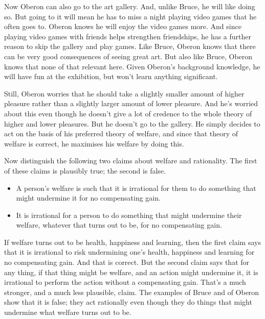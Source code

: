 \documentclass[
  10pt,
  letterpaper,
  twoside]{scrbook}
\providecommand{\tightlist}{%
  \setlength{\itemsep}{0pt}\setlength{\parskip}{0pt}}\usepackage{longtable,booktabs,array}
\begin{document}
Now {Oberon} can also go to the art gallery. And, unlike {Bruce}, he
will like doing so. But going to it will mean he has to miss a night
playing video games that he often goes to. {Oberon} knows he will enjoy
the video games more. And since playing video games with friends helps
strengthen friendships, he has a further reason to skip the gallery and
play games. Like {Bruce}, {Oberon} knows that there can be very good
consequences of seeing great art. But also like {Bruce}, {Oberon} knows
that none of that relevant here. Given {Oberon}'s background knowledge,
he will have fun at the exhibition, but won't learn anything
significant.

Still, {Oberon} worries that he should take a slightly smaller amount of
higher pleasure rather than a slightly larger amount of lower pleasure.
And he's worried about this even though he doesn't give a lot of
credence to the whole theory of higher and lower pleasures. But he
doesn't go to the gallery. He simply decides to act on the basis of his
preferred theory of welfare, and since that theory of welfare is
correct, he maximises his welfare by doing this.

Now distinguish the following two claims about welfare and rationality.
The first of these claims is plausibly true; the second is false.

\begin{itemize}
\tightlist
\item
  A person's welfare is such that it is irrational for them to do
  something that might undermine it for no compensating gain.
\item
  It is irrational for a person to do something that might undermine
  their welfare, whatever that turns out to be, for no compensating
  gain.
\end{itemize}

If welfare turns out to be health, happiness and learning, then the
first claim says that it is irrational to risk undermining one's health,
happiness and learning for no compensating gain. And that is correct.
But the second claim says that for any thing, if that thing might be
welfare, and an action might undermine it, it is irrational to perform
the action without a compensating gain. That's a much stronger, and a
much less plausible, claim. The examples of {Bruce} and of {Oberon} show
that it is false; they act rationally even though they do things that
might undermine what welfare turns out to be.
\end{document}
